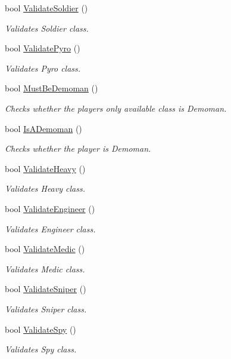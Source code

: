 \begin{DoxyCompactItemize}
bool \hyperlink{class_player_ab5a960410e5c468e83bf651e0eceefeb}{Validate\+Soldier} ()
\begin{DoxyCompactList}\small\item\em Validates Soldier class. \end{DoxyCompactList}\item 
bool \hyperlink{class_player_ae9efa548a673a85c647bb2f277758ac8}{Validate\+Pyro} ()
\begin{DoxyCompactList}\small\item\em Validates Pyro class. \end{DoxyCompactList}\item 
bool \hyperlink{class_player_abed3b8f57e4c0c1195ee31eb39773b5f}{Must\+Be\+Demoman} ()
\begin{DoxyCompactList}\small\item\em Checks whether the player\textquotesingle{}s only available class is Demoman. \end{DoxyCompactList}\item 
bool \hyperlink{class_player_ab440f9658e90851537ecab9689014421}{Is\+A\+Demoman} ()
\begin{DoxyCompactList}\small\item\em Checks whether the player is Demoman. \end{DoxyCompactList}\item 
bool \hyperlink{class_player_a3129459280a43146ff7273e25c9c9910}{Validate\+Heavy} ()
\begin{DoxyCompactList}\small\item\em Validates Heavy class. \end{DoxyCompactList}\item 
bool \hyperlink{class_player_ae248a4a84b6219400d56d76cf2893ae3}{Validate\+Engineer} ()
\begin{DoxyCompactList}\small\item\em Validates Engineer class. \end{DoxyCompactList}\item 
bool \hyperlink{class_player_a892bc0aecc4f485cc97fad89680e83cc}{Validate\+Medic} ()
\begin{DoxyCompactList}\small\item\em Validates Medic class. \end{DoxyCompactList}\item 
bool \hyperlink{class_player_ad59223bff91b71bff98ead0a1bd83738}{Validate\+Sniper} ()
\begin{DoxyCompactList}\small\item\em Validates Sniper class. \end{DoxyCompactList}\item 
bool \hyperlink{class_player_a92965548db9cd01fb649a8175ab93a03}{Validate\+Spy} ()
\begin{DoxyCompactList}\small\item\em Validates Spy class. \end{DoxyCompactList}\end{DoxyCompactItemize}


